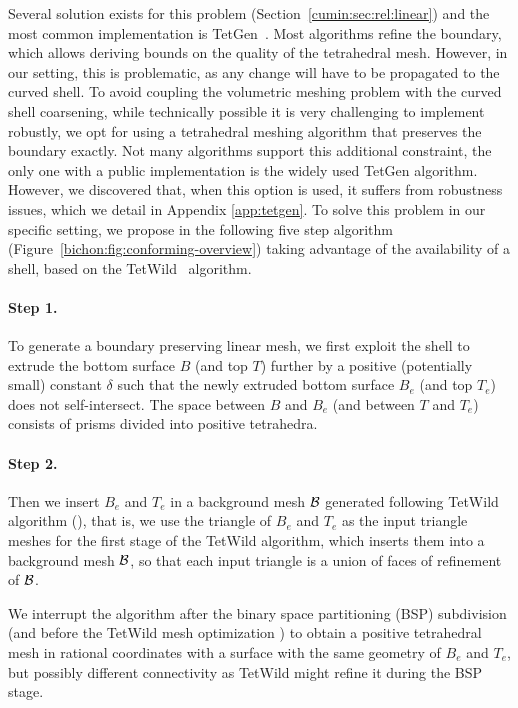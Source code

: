 Several solution exists for this problem (Section~\ref{cumin:sec:rel:linear}) and the most common implementation is TetGen~\cite{tetgen}. Most algorithms refine the boundary, which allows {deriving} bounds on the quality of the tetrahedral mesh. However, in our setting, this is problematic, as any change will have to be propagated to the curved shell. To avoid coupling the volumetric meshing problem with the curved shell coarsening, while technically possible it is very challenging to implement robustly, we opt for using a tetrahedral meshing algorithm that preserves the boundary exactly. Not many algorithms support this additional constraint, the only one with a public implementation is the widely used TetGen algorithm. However, we discovered that, when this option is used, it suffers from robustness issues, which we detail in Appendix \ref{app:tetgen}.
%
To solve this problem in our specific setting, we propose in the following five step algorithm (Figure~\ref{bichon:fig:conforming-overview}) taking advantage of the availability of a shell, based on the  TetWild~\cite{hu2018tetrahedral} algorithm. %

\paragraph{Step 1.}
To generate a boundary preserving linear mesh, we first exploit the shell to extrude the bottom surface $B$ (and top $T$) {further} by a positive (potentially small) constant $\delta$ such that the newly extruded bottom surface $B_e$ (and top $T_e$) does not self-intersect. The space between $B$ and $B_e$ (and between $T$ and $T_e$) consists of prisms {divided} into positive tetrahedra. 

\paragraph{Step 2.}
Then we insert $B_e$ and $T_e$ in a background mesh $\mathcal{B}$ generated following TetWild algorithm (\cite[Section 3.1]{hu2018tetrahedral}), that is, we use the triangle of $B_e$ and $T_e$ as the input triangle meshes for the first stage of the TetWild algorithm, which inserts them into a background mesh $\mathcal{B}$, so that
each input triangle is a union of faces of refinement of $\mathcal{B}$.


We interrupt the algorithm after the  binary space partitioning (BSP) subdivision (and before the TetWild mesh optimization \cite[Section 3.2]{hu2018tetrahedral})
to obtain a positive tetrahedral mesh in rational coordinates with a surface with the same geometry of $B_e$ and $T_e$, but possibly different connectivity as TetWild might refine it during the BSP stage.

